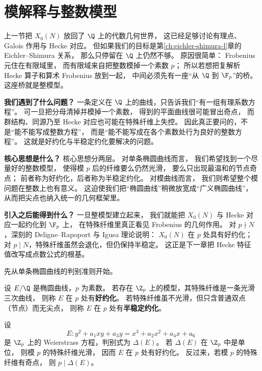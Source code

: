 \section{模解释与整数模型}
\label{sec:ch07-modular-interpretation}

上一节把 $X_0(N)$ 放回了 $\Q$ 上的代数几何世界，
这已经足够讨论有理点、Galois 作用与 Hecke 对应。
但如果我们的目标是第\ref{ch:eichler-shimura-l}章的 Eichler--Shimura 关系，
那么只停留在 $\Q$ 上仍然不够。
原因很简单：
Frobenius 元住在有限域里，
而有限域来自把整数模掉一个素数 $p$；
所以若想把复解析 Hecke 算子和算术 Frobenius 放到一起，
中间必须先有一座“从 $\Q$ 到 $\F_p$”的桥。
这座桥就是整模型。

\textbf{我们遇到了什么问题？}
一条定义在 $\Q$ 上的曲线，只告诉我们“有一组有理系数方程”。
可一旦把分母清掉并模掉一个素数，
得到的平面曲线很可能冒出奇点，
而群结构、同源乃至 Hecke 对应也可能在特殊纤维上失控。
因此真正要问的，不是“能不能写成整数方程”，
而是“能不能写成在各个素数处行为良好的整数方程”。
这就是好约化与半稳定约化要解决的问题。

\textbf{核心思想是什么？}
核心思想分两层。
对单条椭圆曲线而言，
我们希望找到一个尽量好的整数模型，
使得模 $p$ 后的纤维要么仍然光滑，
要么只出现最温和的节点奇点；
前者称为好约化，后者称为半稳定约化。
对模曲线而言，
我们则希望整个模问题在整数上也有意义。
这迫使我们把“椭圆曲线”稍微放宽成“广义椭圆曲线”，
从而把尖点也纳入统一的几何框架里。

\textbf{引入之后能得到什么？}
一旦整模型建立起来，
我们就能把 $X_0(N)$ 与 Hecke 对应一起约化到 $\F_p$ 上，
在特殊纤维里真正看见 Frobenius 的几何作用。
对 $p\nmid N$，深刻的 Deligne--Rapoport 与 Igusa 理论说明：
$X_0(N)$ 在 $p$ 处具有好约化；
对 $p\mid N$，特殊纤维虽然会退化，但仍保持半稳定。
这正是下一章把 Hecke 特征值改写成点数公式的根基。



先从单条椭圆曲线的判别准则开始。

\begin{definition}[好约化与半稳定约化]
\label{def:ch07-good-semistable-reduction}
设 $E/\Q$ 是椭圆曲线，$p$ 为素数。
若存在 $\Z_p$ 上的模型，其特殊纤维是一条光滑三次曲线，
则称 $E$ 在 $p$ 处有\textbf{好约化}。
若特殊纤维虽不光滑，但只含普通双点（节点）而无尖点，
则称 $E$ 在 $p$ 处有\textbf{半稳定约化}。
\end{definition}

\begin{proposition}[判别式判定好约化]
\label{prop:ch07-discriminant-good-reduction}
设
\[
  E: y^2+a_1xy+a_3y=x^3+a_2x^2+a_4x+a_6
\]
是 $\Z_p$ 上的 Weierstrass 方程，判别式为 $\Delta(E)$。
若 $\Delta(E)$ 在 $\Z_p$ 中是单位，
则模 $p$ 的特殊纤维光滑，
因而 $E$ 在 $p$ 处有好约化。
反过来，若模 $p$ 的特殊纤维有奇点，
则 $p\mid \Delta(E)$。
\end{proposition}

